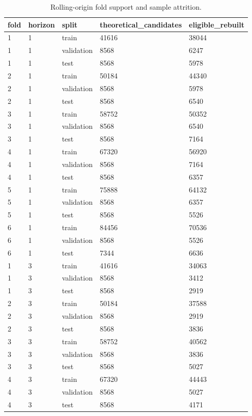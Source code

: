 \begin{table}[!htbp]
\centering
\caption{Rolling-origin fold support and sample attrition.}
\begin{tabular}{lllll}
\hline
fold & horizon & split & theoretical\_candidates & eligible\_rebuilt \\ 
\hline
1 & 1 & train & 41616 & 38044 \\
1 & 1 & validation & 8568 & 6247 \\
1 & 1 & test & 8568 & 5978 \\
2 & 1 & train & 50184 & 44340 \\
2 & 1 & validation & 8568 & 5978 \\
2 & 1 & test & 8568 & 6540 \\
3 & 1 & train & 58752 & 50352 \\
3 & 1 & validation & 8568 & 6540 \\
3 & 1 & test & 8568 & 7164 \\
4 & 1 & train & 67320 & 56920 \\
4 & 1 & validation & 8568 & 7164 \\
4 & 1 & test & 8568 & 6357 \\
5 & 1 & train & 75888 & 64132 \\
5 & 1 & validation & 8568 & 6357 \\
5 & 1 & test & 8568 & 5526 \\
6 & 1 & train & 84456 & 70536 \\
6 & 1 & validation & 8568 & 5526 \\
6 & 1 & test & 7344 & 6636 \\
1 & 3 & train & 41616 & 34063 \\
1 & 3 & validation & 8568 & 3412 \\
1 & 3 & test & 8568 & 2919 \\
2 & 3 & train & 50184 & 37588 \\
2 & 3 & validation & 8568 & 2919 \\
2 & 3 & test & 8568 & 3836 \\
3 & 3 & train & 58752 & 40562 \\
3 & 3 & validation & 8568 & 3836 \\
3 & 3 & test & 8568 & 5027 \\
4 & 3 & train & 67320 & 44443 \\
4 & 3 & validation & 8568 & 5027 \\
4 & 3 & test & 8568 & 4171 \\
\hline
\end{tabular}
\end{table}
